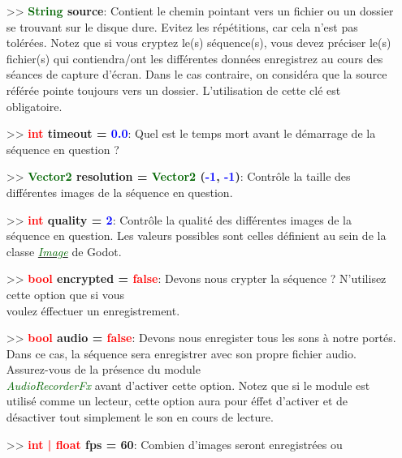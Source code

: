 \documentclass[a4paper, 11pt]{article}
\begin{document}
\begin{itemize}
\begin{itemize}
		\end{itemize}
		\item[>> \textbf{\textcolor{darkgreen}{String} source}:] Contient le chemin pointant vers un fichier 
		ou un dossier se trouvant sur le disque dure. Evitez les répétitions, car cela n'est pas tolérées.
		Notez que si vous cryptez le(s) séquence(s), vous devez préciser le(s) fichier(s) qui contiendra/ont 
		les différentes données enregistrez au cours des séances de capture d'écran. Dans le cas contraire,
		on considéra que la source référée pointe toujours vers un dossier. L'utilisation de cette clé est
		obligatoire.\\
		\item[>> \textbf{\textcolor{red}{int} timeout = \textcolor{blue}{0.0}}:] Quel est le temps mort
		avant le démarrage de la séquence en question ?\\
		\item[>> \textbf{\textcolor{darkgreen}{Vector2} resolution = \textcolor{darkgreen}{Vector2}
		(\textcolor{blue}{-1}, \textcolor{blue}{-1})}:] Contrôle la taille des différentes images de la
		séquence en question.\\
		\item[>> \textbf{\textcolor{red}{int} quality = \textcolor{blue}{2}}:] Contrôle la qualité des 
		différentes images de la séquence en question. Les valeurs possibles sont celles définient au sein
		de la classe \href{https://docs.godotengine.org/en/stable/classes/class_image.html}
		{\textit{\textcolor{darkgreen}{Image}}} de Godot.\\
		\item[>> \textbf{\textcolor{red}{bool} encrypted = \textcolor{red}{false}}:] Devons nous crypter la
		séquence ? N'utilisez cette option que si vous \\voulez éffectuer un enregistrement.\\
		\item[>> \textbf{\textcolor{red}{bool} audio = \textcolor{red}{false}}:] Devons nous enregister tous 
		les sons à notre portés. Dans ce cas, la séquence sera enregistrer avec son propre fichier audio.
		Assurez-vous de la présence du module \textit{\textcolor{darkgreen}{\\AudioRecorderFx}} avant 
		d'activer cette option. Notez que si le module est utilisé comme un lecteur, cette option aura pour
		éffet d'activer et de désactiver tout simplement le son en cours de lecture.\\
		\item[>> \textbf{\textcolor{red}{int | float} fps = 60}:] Combien d'images seront enregistrées ou 

\end{itemize}
\end{document}
